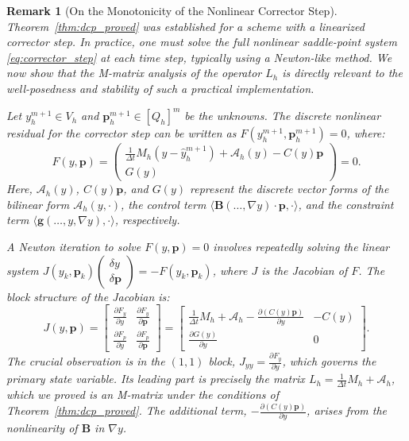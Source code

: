 \documentclass[pdflatex,sn-mathphys-num]{sn-jnl}%
\theoremstyle{thmstyleone}%
\newtheorem{rmk}{Remark}[section]
\numberwithin{equation}{section}
\begin{document}
\begin{rmk}[On the Monotonicity of the Nonlinear Corrector Step]
\label{rmk:nonlinear_jacobian}
Theorem~\ref{thm:dcp_proved} was established for a scheme with a linearized corrector step. In practice, one must solve the full nonlinear saddle-point system \eqref{eq:corrector_step} at each time step, typically using a Newton-like method. We now show that the M-matrix analysis of the operator $L_h$ is directly relevant to the well-posedness and stability of such a practical implementation.

Let $y_h^{m+1} \in V_h$ and $\bm{p}_h^{m+1} \in [Q_h]^m$ be the unknowns. The discrete nonlinear residual for the corrector step can be written as $F(y_h^{m+1}, \bm{p}_h^{m+1}) = 0$, where:
$$
F(y, \bm{p}) = 
\begin{pmatrix}
\frac{1}{\Delta t}M_h(y - \hat{y}_h^{m+1}) + \mathcal{A}_h(y) - C(y)\bm{p} \\
G(y)
\end{pmatrix} = 0.
$$
Here, $\mathcal{A}_h(y)$, $C(y)\bm{p}$, and $G(y)$ represent the discrete vector forms of the bilinear form $\mathcal{A}_h(y, \cdot)$, the control term $\langle \bm{B}(\dots, \nabla y)\cdot\bm{p}, \cdot \rangle$, and the constraint term $\langle \bm{g}(\dots, y, \nabla y), \cdot \rangle$, respectively.

A Newton iteration to solve $F(y, \bm{p}) = 0$ involves repeatedly solving the linear system $J(y_k, \bm{p}_k) \begin{pmatrix} \delta y \\ \delta\bm{p} \end{pmatrix} = -F(y_k, \bm{p}_k)$, where $J$ is the Jacobian of $F$. The block structure of the Jacobian is:
$$
J(y, \bm{p}) = 
\begin{bmatrix}
\frac{\partial F_y}{\partial y} & \frac{\partial F_y}{\partial \bm{p}} \\
\frac{\partial F_p}{\partial y} & \frac{\partial F_p}{\partial \bm{p}}
\end{bmatrix}
=
\begin{bmatrix}
\frac{1}{\Delta t}M_h + \mathcal{A}_h - \frac{\partial (C(y)\bm{p})}{\partial y} & -C(y) \\
\frac{\partial G(y)}{\partial y} & 0
\end{bmatrix}.
$$
The crucial observation is in the $(1,1)$ block, $J_{yy} = \frac{\partial F_y}{\partial y}$, which governs the primary state variable. Its leading part is precisely the matrix $L_h = \frac{1}{\Delta t}M_h + \mathcal{A}_h$, which we proved is an M-matrix under the conditions of Theorem~\ref{thm:dcp_proved}. The additional term, $-\frac{\partial (C(y)\bm{p})}{\partial y}$, arises from the nonlinearity of $\bm{B}$ in $\nabla y$.


\end{rmk}
\end{document}
